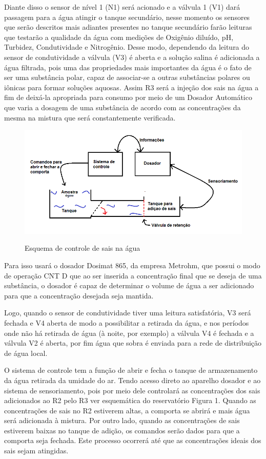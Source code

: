 Diante disso o sensor de nível 1 (N1) será acionado e  a válvula 1 (V1) dará passagem para a água atingir o tanque secundário, nesse momento os sensores que serão descritos mais adiantes presentes no tanque secundário farão leituras que testarão a qualidade da água com medições de Oxigênio diluído, pH, Turbidez, Condutividade e Nitrogênio. Desse modo, dependendo da leitura do sensor de condutividade a válvula (V3) é aberta e a solução salina é adicionada a água filtrada, pois uma das propriedades mais importantes da água é o fato de ser uma substância polar, capaz de associar-se a outras substâncias polares ou iônicas para formar soluções aquosas. Assim R3 será a injeção dos sais na água a fim de deixá-la apropriada para consumo por meio de um Dosador Automático que varia a dosagem de uma substância de acordo com as concentrações da mesma na mistura que será constantemente verificada.

\FloatBarrier
\begin{figure}[!h]
      \centering
      \includegraphics[scale = 0.6]{editaveis/figuras/controle_sais}
      \label{controle_sais}
      \caption[Esquema controle sais]{Esquema de controle de sais na água}
    \end{figure}
    \FloatBarrier
Para isso usará o dosador Dosimat 865, da empresa Metrohm, que possui o modo de operação CNT D que ao ser inserida a concentração final que se deseja de uma substância, o dosador é capaz de determinar o volume de água a ser adicionado para que a concentração desejada seja mantida.
	
	Logo, quando o sensor de condutividade tiver uma leitura satisfatória, V3 será fechada e V4 aberta de modo a possibilitar a retirada da água, e nos períodos onde não há retirada de água (à noite, por exemplo) a válvula V4 é fechada e a válvula V2 é aberta, por fim água que sobra é enviada para a rede de distribuição de água local. 

O sistema de controle tem a função de abrir e fecha o tanque de armazenamento da água retirada da umidade do ar. Tendo acesso direto ao aparelho dosador e ao sistema de sensoriamento, pois por meio dele controlará as concentrações dos sais adicionados ao R2 pelo R3 ver esquemática do reservatório Figura 1. Quando as concentrações de sais no R2 estiverem altas, a comporta se abrirá e mais água será adicionada à mistura. Por outro lado, quando as concentrações de sais estiverem baixas no tanque de adição, os comandos serão dados para que a comporta seja fechada. Este processo ocorrerá até que as concentrações ideais dos sais sejam atingidas.

